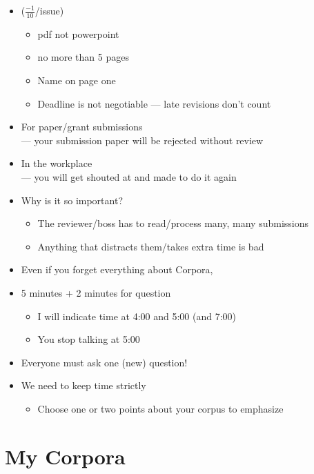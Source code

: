 \documentclass[a4paper,landscape,headrule,footrule,dvips]{foils}
\begin{document}
\begin{CJK}{UTF8}{min}
\begin{itemize}\addtolength{\itemsep}{-1.5ex}
\item {} ($\frac{-1}{10}$/issue)
  \begin{itemize}
  \item pdf not powerpoint
  \item no more than 5 pages
  \item Name on page one
  \item Deadline is not negotiable --- late revisions don't count 
  \end{itemize}
\item For paper/grant submissions 
\\ --- your submission paper will be rejected without review
\item In the workplace
\\ --- you will get shouted at and made to do it again
\item Why is it so important?
  \begin{itemize}
  \item The reviewer/boss has to read/process many, many submissions
  \item Anything that distracts them/takes extra time is bad
  \end{itemize}
\item Even if you forget everything about Corpora, 
\end{itemize}

\MyLogo{}
\begin{itemize}
\item 5 minutes + 2 minutes for question
  \begin{itemize}
  \item I will indicate time at 4:00 and 5:00 (and 7:00)
  \item You  stop talking at 5:00
  \end{itemize}
\item Everyone must ask one (new) question!
\item We need to keep time strictly
  \begin{itemize}
  \item Choose one or two points about your corpus to emphasize
  \end{itemize}
\end{itemize}

\section{My Corpora}


\end{CJK}
\end{document}
